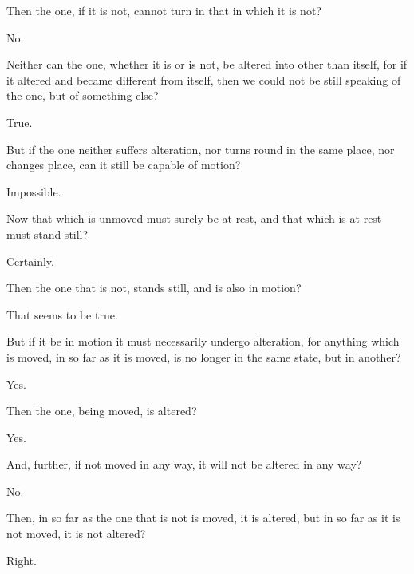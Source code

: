\documentclass[11pt,letter]{article}
\begin{document}
\par  Then the one, if it is not, cannot turn in that in which it is not?

\par  No.

\par  Neither can the one, whether it is or is not, be altered into other than itself, for if it altered and became different from itself, then we could not be still speaking of the one, but of something else?

\par  True.

\par  But if the one neither suffers alteration, nor turns round in the same place, nor changes place, can it still be capable of motion?

\par  Impossible.

\par  Now that which is unmoved must surely be at rest, and that which is at rest must stand still?

\par  Certainly.

\par  Then the one that is not, stands still, and is also in motion?

\par  That seems to be true.

\par  But if it be in motion it must necessarily undergo alteration, for anything which is moved, in so far as it is moved, is no longer in the same state, but in another?

\par  Yes.

\par  Then the one, being moved, is altered?

\par  Yes.

\par  And, further, if not moved in any way, it will not be altered in any way?

\par  No.

\par  Then, in so far as the one that is not is moved, it is altered, but in so far as it is not moved, it is not altered?

\par  Right.
\end{document}
